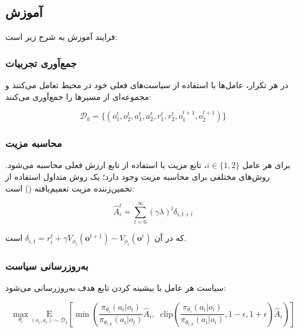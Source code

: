 
\subsection{آموزش }

فرایند آموزش  به شرح زیر است:

\subsubsection{جمع‌آوری تجربیات}

در هر تکرار، عامل‌ها با استفاده از سیاست‌های فعلی خود در محیط تعامل می‌کنند و مجموعه‌ای از مسیرها را جمع‌آوری می‌کنند:

\begin{equation}
    \mathcal{D}_k = \{(o_1^t, o_2^t, a_1^t, a_2^t, r_1^t, r_2^t, o_1^{t+1}, o_2^{t+1})\}
\end{equation}

\subsubsection{محاسبه مزیت}

برای هر عامل $i \in \{1, 2\}$، تابع مزیت با استفاده از تابع ارزش فعلی محاسبه می‌شود. روش‌های مختلفی برای محاسبه مزیت وجود دارد؛ یک روش متداول استفاده از تخمین‌زننده مزیت تعمیم‌یافته () است:

\begin{equation}
    \hat{A}_i^t = \sum_{l=0}^{\infty} (\gamma\lambda)^l \delta_{i,t+l}
\end{equation}

که در آن $\delta_{i,t} = r_i^t + \gamma V_{\phi_i}(\boldsymbol{o}^{t+1}) - V_{\phi_i}(\boldsymbol{o}^t)$ است.

\subsubsection{به‌روزرسانی سیاست}

سیاست هر عامل با بیشینه کردن تابع هدف  به‌روزرسانی می‌شود:

\begin{equation}
    \max_{\theta_i} \underset{(o_i,a_i) \sim \mathcal{D}_k}{\mathrm{E}}\left[ \min\left( \frac{\pi_{\theta_i}(a_i|o_i)}{\pi_{\theta_{i,k}}(a_i|o_i)} \hat{A}_i, \;\; \text{clip}\left(\frac{\pi_{\theta_i}(a_i|o_i)}{\pi_{\theta_{i,k}}(a_i|o_i)}, 1 - \epsilon, 1+\epsilon \right) \hat{A}_i \right) \right]
\end{equation}

